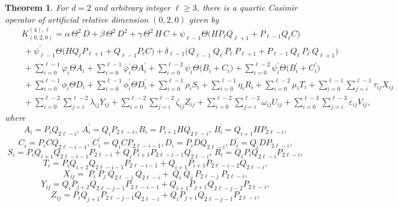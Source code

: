 \documentclass[12pt]{article}
\newtheorem{thm}{Theorem}
\begin{document}
\begin{thm}
For $d=2$  and arbitrary integer $\ell \geq3$, there is a quartic Casimir operator of artificial relative
dimension $(0, 2,0)$ given by
\begin{eqnarray}
&&K^{(4),\ell}_{(0,2,0)}= \alpha \, \Theta^2 \,D +\beta \, \Theta^2 \,D^{2} +\gamma \, \Theta^2\, H\, C + \psi_{\ell -1}\Theta \Big (H P_{\ell}Q_{\ell +1}+ P_{\ell -1}Q_{\ell }C\Big) \nonumber\\
&&\ + \psi^{'}_{\ell -1} \Theta \Big(H Q_{\ell}P_{\ell +1}+ Q_{\ell -1}P_{\ell }C\Big) +\delta_{\ell -1}\Big( Q_{\ell -1} \ Q_{\ell } \ P_{\ell} \ P_{\ell+1}+ P_{\ell -1} \ Q_{\ell } \ P_{\ell} \ Q_{\ell+1} \Big ) \nonumber\\
  &&\ + \sum\limits_{i=0}^{\ell- 1}\varphi_{i} \Theta A_{i} + \sum\limits_{i=0}^{\ell- 1}\varphi^{'}_{i}\Theta  A^{'}_{i} 
 +\sum\limits_{i=0}^{\ell- 2} \psi_{i}\Theta \Bigg(B_{i}+ C_{i}\Bigg) + \sum\limits_{i=0}^{\ell- 2} \psi^{'}_{i}\Theta \Bigg(B^{'}_{i}+ C^{'} _{i}\Bigg)
 \nonumber\\
  &&\ + \sum\limits_{i=0}^{\ell- 1}  \phi_{i}\Theta D_{i}+ \sum\limits_{i=0}^{\ell- 1}  \phi^{'}_{i}\Theta D^{'}_{i} + \sum\limits_{i=0}^{\ell- 1} \rho_{i} S_{i} + 
 \sum\limits_{i=0}^{\ell- 1} \eta_{i} R_{i} +  \sum\limits_{i=0}^{\ell- 2} \mu_{i} T_{i}+ \sum\limits_{i=0}^{\ell-1}   \sum\limits_{j=i}^{\ell-1}  \tau_{ij} X_{ij} \nonumber\\
&&\ +   \sum\limits_{i=0}^{\ell -2}   \sum\limits_{j=i}^{\ell - 2} \lambda_{ij} Y_{ij} +    \sum\limits_{i=0}^{\ell -2}   \sum\limits_{j=i}^{\ell - 2} \zeta_{ij} Z_{ij} +    \sum\limits_{i=0}^{\ell -2}   \sum\limits_{j=i}^{\ell - 2} \omega_{ij} U_{ij}+    \sum\limits_{i=0}^{\ell -3}   \sum\limits_{j=i}^{\ell - 3} \varepsilon_{ij} V_{ij},  \label{TRb} 
\end{eqnarray}
where    
$$
A_{i}=P_{i}Q_{2\ell-i}, \, A^{'}_{i}=Q_{i}P_{2\ell-i}, B_{i}=  P_{i+1}HQ_{2\ell-i}, \, B^{'}_{i}= Q_{i+1}HP_{2\ell-i}, 
$$
$$
  C_{i} =P_{i} C Q_{2\ell-i-1}, \, C^{'}_{i} = Q_{i}  C  P_{2\ell-i-1},
  D_{i} = P_{i}D Q_{2\ell-i}, D^{'}_{i} = Q_{i}D P_{2\ell-i}, 
$$
$$
 S_{i} = P_{i}Q_{i+1}Q_{2\ell-i-1}P_{2\ell-i} +Q_{i}P_{i+1}P_{2\ell-i-1}Q_{2\ell-i},\, R_{i} = Q_{i}P_{i}Q_{2\ell-i}P_{2\ell-i},
$$
$$
T_{i} =P_{i}Q_{i+2}Q_{2\ell-i-1}P_{2\ell-i-1} +Q_{i+1}P_{i+1}P_{2\ell-i-2}Q_{2\ell-i},
$$
$$
X_{ij} = \  P_{i} \ P_{j} \ Q_{2\ell-j} \ Q_{2\ell-i}+\  Q_{i} \ Q_{j} \ P_{2\ell-j} \ P_{2\ell-i}  ,
$$
$$
   Y_{ij}=Q_{i} P_{j+2}  Q_{2\ell-j-1} P_{2\ell-i-1} +Q_{i+1}  P_{j+1} Q_{2\ell-j-2} P_{2\ell-i},
$$
$$
  Z_{ij}=P_{i} Q_{j+1}  P_{2\ell-j-1} Q_{2\ell-i} +Q_{i}  P_{j+1} Q_{2\ell-j-1} P_{2\ell-i}, 
$$
\end{thm}
\end{document}
